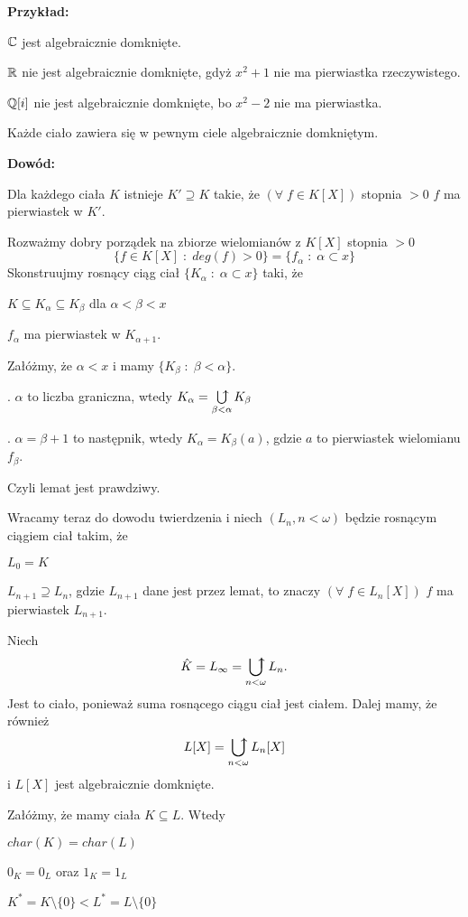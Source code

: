 \textbf{Przykład:}

\indent \point $\mathbb{C}$ jest algebraicznie domknięte.

\indent \point $\mathbb{R}$ nie jest algebraicznie domknięte, gdyż $x^2+1$ nie ma pierwiastka rzeczywistego.

\indent \point $\mathbb{Q}[i]$ nie jest algebraicznie domknięte, bo $x^2-2$ nie ma pierwiastka.

\begin{tw}
    Każde ciało zawiera się w pewnym ciele algebraicznie domkniętym.
\end{tw}

\textbf{Dowód:}

 Dla każdego ciała $K$ istnieje $K'\supseteq K$ takie, że $(\forall\;f\in K[X])$ stopnia $>0$ $f$ ma pierwiastek w $K'$.

Rozważmy dobry porządek na zbiorze wielomianów z $K[X]$ stopnia $>0$
$$\{f\in K[X]\;:\;deg(f)>0\}=\{f_\alpha\;:\;\alpha\subset x\}$$
Skonstruujmy rosnący ciąg ciał $\{K_\alpha\;:\;\alpha\subset x\}$ taki, że 

\indent \point $K\subseteq K_\alpha\subseteq K_\beta$ dla $\alpha<\beta< x$

\indent \point $f_\alpha$ ma pierwiastek w $K_{\alpha+1}$.

Załóżmy, że $\alpha<x$ i mamy $\{K_\beta\;:\;\beta<\alpha\}$.

. $\alpha$ to liczba graniczna, wtedy $K_\alpha=\ubigcup\limits_{\beta<\alpha}K_\beta$

. $\alpha=\beta+1$ to następnik, wtedy $K_\alpha=K_\beta(a)$, gdzie $a$ to pierwiastek wielomianu $f_\beta$.

Czyli lemat jest prawdziwy.

Wracamy teraz do dowodu twierdzenia i niech $(L_n,n<\omega)$ będzie rosnącym ciągiem ciał takim, że

\indent \point $L_0=K$

\indent \point $L_{n+1}\supseteq L_n$, gdzie $L_{n+1}$ dane jest przez lemat, to znaczy $(\forall\;f\in L_n[X])$ $f$ ma pierwiastek $L_{n+1}$.

Niech
$$\hat{K}=L_\infty=\ubigcup\limits_{n<\omega}L_n.$$
Jest to ciało, ponieważ suma rosnącego ciągu ciał jest ciałem. Dalej mamy, że również
$$L[X]=\ubigcup\limits_{n<\omega}L_n[X]$$
i $L[X]$ jest algebraicznie domknięte.

\begin{uwaga}
    Załóżmy, że mamy ciała $K\subseteq L$. Wtedy

\indent \point $char(K)=char(L)$

\indent \point $0_K=0_L$ oraz $1_K=1_L$

\indent \point $K^*=K\setminus\{0\}<L^*=L\setminus\{0\}$
\end{uwaga}

